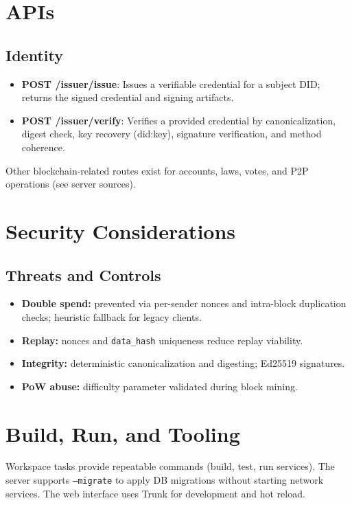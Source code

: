 \documentclass[12pt,a4paper]{report}
\begin{document}
\chapter{APIs}
\section{Identity}
\begin{itemize}[noitemsep]
  \item \textbf{POST /issuer/issue}: Issues a verifiable credential for a subject DID; returns the signed credential and signing artifacts.
  \item \textbf{POST /issuer/verify}: Verifies a provided credential by canonicalization, digest check, key recovery (did:key), signature verification, and method coherence.
\end{itemize}
\noindent Other blockchain-related routes exist for accounts, laws, votes, and P2P operations (see server sources).

\chapter{Security Considerations}
\section{Threats and Controls}
\begin{itemize}[noitemsep]
  \item \textbf{Double spend:} prevented via per-sender nonces and intra-block duplication checks; heuristic fallback for legacy clients.
  \item \textbf{Replay:} nonces and \texttt{data\_hash} uniqueness reduce replay viability.
  \item \textbf{Integrity:} deterministic canonicalization and digesting; Ed25519 signatures.
  \item \textbf{PoW abuse:} difficulty parameter validated during block mining.
\end{itemize}

\chapter{Build, Run, and Tooling}
Workspace tasks provide repeatable commands (build, test, run services). The server supports \texttt{--migrate} to apply DB migrations without starting network services. The web interface uses Trunk for development and hot reload.
\end{document}
